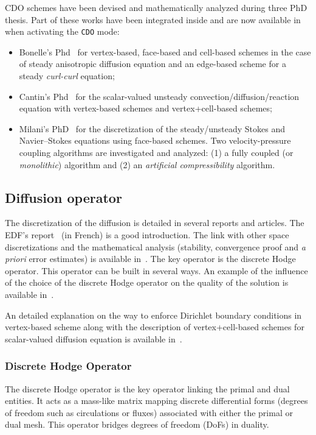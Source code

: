 CDO schemes have been devised and mathematically analyzed during three PhD
thesis. Part of these works have been integrated inside \CS and are now
available in \CS when activating the \texttt{CDO} mode:
\begin{itemize}
\item Bonelle's Phd~\cite{Bonel14} for vertex-based, face-based and cell-based
  schemes in the case of steady anisotropic diffusion equation and an
  edge-based scheme for a steady \emph{curl-curl} equation;
\item Cantin's Phd~\cite{Cant16} for the scalar-valued unsteady
  convection/diffusion/reaction equation with vertex-based schemes and
  vertex+cell-based schemes;
\item Milani's PhD~\cite{Mila20} for the discretization of the steady/unsteady
  Stokes and Navier--Stokes equations using face-based schemes. Two
  velocity-pressure coupling algorithms are investigated and analyzed: (1) a
  fully coupled (or \textit{monolithic}) algorithm and (2) an
  \textit{artificial compressibility} algorithm.
\end{itemize}

\subsection{Diffusion operator}

The discretization of the diffusion is detailed in several reports and
articles. The EDF's report~\cite{Bonel12} (in French) is a good
introduction. The link with other space discretizations and the mathematical
analysis (stability, convergence proof and \emph{a priori} error estimates) is
available in~\cite{BonEr14}. The key operator is the discrete Hodge
operator. This operator can be built in several ways. An example of the
influence of the choice of the discrete Hodge operator on the quality of the
solution is available in~\cite{BDPE15}.

An detailed explanation on the way to enforce Dirichlet boundary conditions in
vertex-based scheme along with the description of vertex+cell-based schemes for
scalar-valued diffusion equation is available in~\cite{Cant16}.

\subsubsection{Discrete Hodge Operator}

The discrete Hodge operator is the key operator linking the primal and dual
entities. It acts as a mass-like matrix mapping discrete differential forms
(degrees of freedom such as circulations or fluxes) associated with either the
primal or dual mesh. This operator bridges degrees of freedom (DoFs) in duality.

